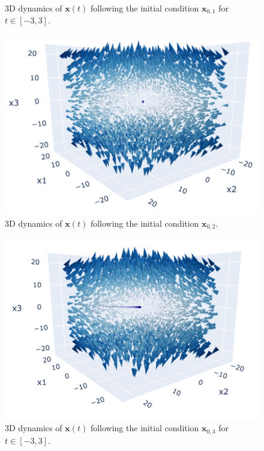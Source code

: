 \documentclass[12pt]{article}
\begin{document}
\begin{enumerate}
\begin{figure}[h!]
    \caption{3D dynamics of $\mathbf{x}(t)$ following the initial condition $\mathbf{x}_{0,1}$ for $t \in [-3, 3]$.}
\end{figure}
\begin{figure}[h]
    \centering
    \includegraphics[width=1\textwidth]{Figures/2.png}
    \caption{3D dynamics of $\mathbf{x}(t)$ following the initial condition $\mathbf{x}_{0,2}$.}
\end{figure}
\begin{figure}[h]
    \centering
    \includegraphics[width=1\textwidth]{Figures/3.png}
    \caption{3D dynamics of $\mathbf{x}(t)$ following the initial condition $\mathbf{x}_{0,3}$ for $t \in [-3, 3]$.}
\end{figure}
\begin{figure}[h]
    \centering

\end{figure}
\end{enumerate}
\end{document}
